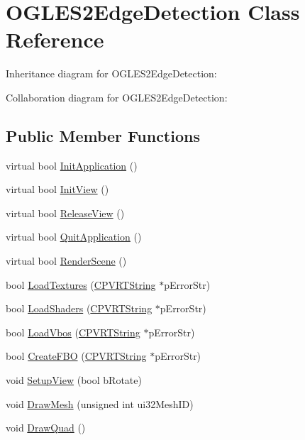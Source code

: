 \hypertarget{class_o_g_l_e_s2_edge_detection}{\section{O\+G\+L\+E\+S2\+Edge\+Detection Class Reference}
\label{class_o_g_l_e_s2_edge_detection}
}


Inheritance diagram for O\+G\+L\+E\+S2\+Edge\+Detection\+:


Collaboration diagram for O\+G\+L\+E\+S2\+Edge\+Detection\+:
\subsection*{Public Member Functions}
\begin{DoxyCompactItemize}
\item 
virtual bool \hyperlink{class_o_g_l_e_s2_edge_detection_a4c6222a2e95a7987893817cb80afda89}{Init\+Application} ()
\item 
virtual bool \hyperlink{class_o_g_l_e_s2_edge_detection_a610f01aa1c6bb1ddca875e2faa381d3e}{Init\+View} ()
\item 
virtual bool \hyperlink{class_o_g_l_e_s2_edge_detection_a8984ab2ebca43403fee23a07e03c156f}{Release\+View} ()
\item 
virtual bool \hyperlink{class_o_g_l_e_s2_edge_detection_ae629967d030d56ab7ce5b77d30164016}{Quit\+Application} ()
\item 
virtual bool \hyperlink{class_o_g_l_e_s2_edge_detection_a2df3b1d47eef2ec8e949f357c6f00edc}{Render\+Scene} ()
\item 
bool \hyperlink{class_o_g_l_e_s2_edge_detection_ae51f97502ae158b8fdf5157028fc6afe}{Load\+Textures} (\hyperlink{class_c_p_v_r_t_string}{C\+P\+V\+R\+T\+String} $\ast$p\+Error\+Str)
\item 
bool \hyperlink{class_o_g_l_e_s2_edge_detection_a5e62fb6fe95578f28e705e465a44aa4b}{Load\+Shaders} (\hyperlink{class_c_p_v_r_t_string}{C\+P\+V\+R\+T\+String} $\ast$p\+Error\+Str)
\item 
bool \hyperlink{class_o_g_l_e_s2_edge_detection_a7868934068118278d525aea834d542ec}{Load\+Vbos} (\hyperlink{class_c_p_v_r_t_string}{C\+P\+V\+R\+T\+String} $\ast$p\+Error\+Str)
\item 
bool \hyperlink{class_o_g_l_e_s2_edge_detection_a83f90c7628f8319e62cb6c92793e9cdf}{Create\+F\+B\+O} (\hyperlink{class_c_p_v_r_t_string}{C\+P\+V\+R\+T\+String} $\ast$p\+Error\+Str)
\item 
void \hyperlink{class_o_g_l_e_s2_edge_detection_a98694ab38268b5d699f02e53cbec229f}{Setup\+View} (bool b\+Rotate)
\item 
void \hyperlink{class_o_g_l_e_s2_edge_detection_a7a63a3496a99c1259ef82169c8b1a803}{Draw\+Mesh} (unsigned int ui32\+Mesh\+I\+D)
\item 
void \hyperlink{class_o_g_l_e_s2_edge_detection_a97c52202a11f23dbb0b7808b38cce447}{Draw\+Quad} ()
\end{DoxyCompactItemize}


